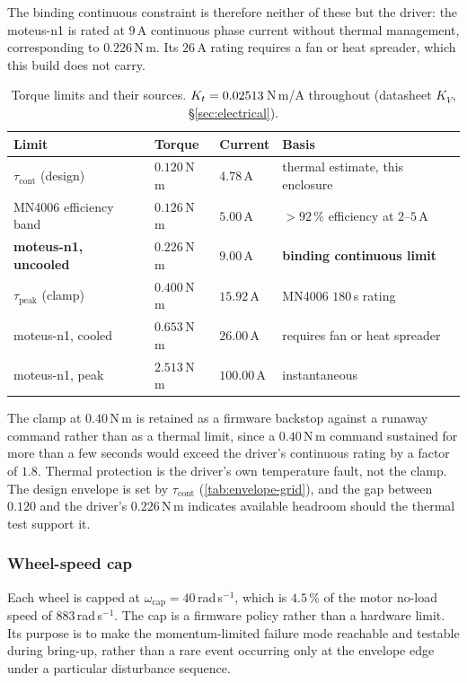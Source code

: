 The binding continuous constraint is therefore neither of these but the
driver: the moteus-n1 is rated at $9$\,A continuous phase current without
thermal management, corresponding to $0.226$\,N\,m. Its $26$\,A rating
requires a fan or heat spreader, which this build does not carry.

\begin{table}[htbp]
\centering
\small
\begin{tabular}{@{}llll@{}}
\toprule
\textbf{Limit} & \textbf{Torque} & \textbf{Current} & \textbf{Basis}\\
\midrule
$\tau_{\mathrm{cont}}$ (design) & $0.120$\,N\,m & $4.78$\,A & thermal estimate, this enclosure\\
MN4006 efficiency band & $0.126$\,N\,m & $5.00$\,A & ${>}92\,\%$ efficiency at $2$--$5$\,A\\
\textbf{moteus-n1, uncooled} & $\bm{0.226}$\,N\,m & $\bm{9.00}$\,A & \textbf{binding continuous limit}\\
$\tau_{\mathrm{peak}}$ (clamp) & $0.400$\,N\,m & $15.92$\,A & MN4006 $180$\,s rating\\
moteus-n1, cooled & $0.653$\,N\,m & $26.00$\,A & requires fan or heat spreader\\
moteus-n1, peak & $2.513$\,N\,m & $100.00$\,A & instantaneous\\
\bottomrule
\end{tabular}
\caption{Torque limits and their sources. $K_t = 0.02513$\,N\,m/A throughout
(datasheet $K_V$, \S\ref{sec:electrical}).}
\label{tab:torque-limits}
\end{table}

The clamp at $0.40$\,N\,m is retained as a firmware backstop against a
runaway command rather than as a thermal limit, since a $0.40$\,N\,m command
sustained for more than a few seconds would exceed the driver's continuous
rating by a factor of $1.8$. Thermal protection is the driver's own
temperature fault, not the clamp. The design envelope is set by
$\tau_{\mathrm{cont}}$ (\cref{tab:envelope-grid}), and the gap between
$0.120$ and the driver's $0.226$\,N\,m indicates available headroom should the
thermal test support it.

\subsubsection{Wheel-speed cap}
\label{sec:wheel-cap}

Each wheel is capped at $\omega_{\mathrm{cap}} = 40$\,rad\,s$^{-1}$, which is
$4.5\,\%$ of the motor no-load speed of $883$\,rad\,s$^{-1}$. The cap is a
firmware policy rather than a hardware limit. Its purpose is to make the
momentum-limited failure mode reachable and testable during bring-up, rather
than a rare event occurring only at the envelope edge under a particular
disturbance sequence.

